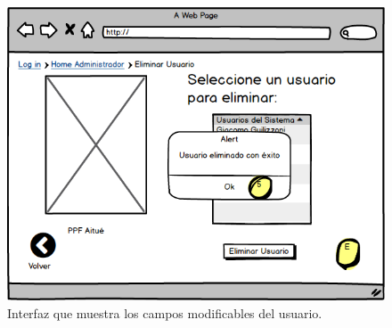\clearpage

\begin{figure}[h!]
	\label{elimuser5}
	\begin{center}
		\includegraphics[scale=0.3]{imagenes/elimuser5.png}
	\end{center}
	\caption{Interfaz que muestra los campos modificables del usuario.}
\end{figure}

